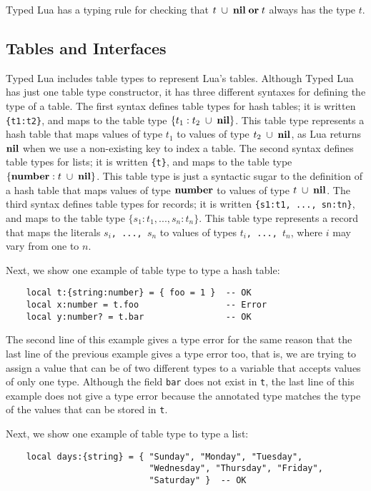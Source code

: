 Typed Lua has a typing rule for checking that
$t\;\cup\;\mathbf{nil}\;\mathbf{or}\;t$ always has the type $t$.

\subsection{Tables and Interfaces}

Typed Lua includes table types to represent Lua's tables.
Although Typed Lua has just one table type constructor, it has three
different syntaxes for defining the type of a table.
The first syntax defines table types for hash tables;
it is written \texttt{\{t1:t2\}},
and maps to the table type $\{t_{1}:t_{2}\;\cup\;\mathbf{nil}\}$.
This table type represents a hash table that maps values of type
$t_{1}$ to values of type $t_{2}\;\cup\;\mathbf{nil}$, as Lua returns
$\mathbf{nil}$ when we use a non-existing key to index a table.
The second syntax defines table types for lists;
it is written \texttt{\{t\}},
and maps to the table type $\{\mathbf{number}:t\;\cup\;\mathbf{nil}\}$.
This table type is just a syntactic sugar to the definition of a
hash table that maps values of type $\mathbf{number}$ to values of type
$t\;\cup\;\mathbf{nil}$.
The third syntax defines table types for records;
it is written \texttt{\{s1:t1, ..., sn:tn\}},
and maps to the table type $\{s_{1}:t_{1}, ..., s_{n}:t_{n}\}$.
This table type represents a record that maps the literals
$s_{i}$\texttt{, ..., }$s_{n}$ to values of types
$t_{i}$\texttt{, ..., }$t_{n}$, where $i$ may vary from one to $n$.

Next, we show one example of table type to type a hash table:
\begin{verbatim}
    local t:{string:number} = { foo = 1 }  -- OK
    local x:number = t.foo                 -- Error
    local y:number? = t.bar                -- OK
\end{verbatim}

The second line of this example gives a type error for the same
reason that the last line of the previous example gives a type error
too, that is, we are trying to assign a value that can be of two
different types to a variable that accepts values of only one type.
Although the field \texttt{bar} does not exist in \texttt{t}, the last
line of this example does not give a type error because the
annotated type matches the type of the values that can be stored in
\texttt{t}.

Next, we show one example of table type to type a list:
\begin{verbatim}
    local days:{string} = { "Sunday", "Monday", "Tuesday",
                            "Wednesday", "Thursday", "Friday",
                            "Saturday" }  -- OK
\end{verbatim}

